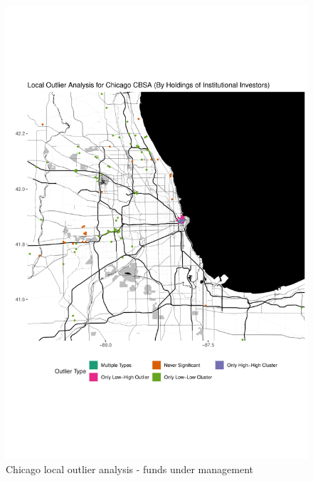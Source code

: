 \begin{figure}
	\centering
	\includegraphics[width=1\linewidth]{Figures/ChapterIV/Chi_Money_LO}
	\caption[Chicago CBSA Local Outlier Analysis - Funds Under Management 2013-2018]{Chicago local outlier analysis - funds under management}
	\label{fig:Chicagolocaloutlier}
\end{figure}


